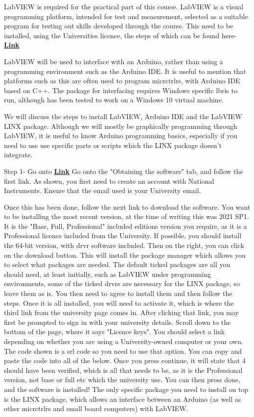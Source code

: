 \documentclass[a4paper,11pt]{report}
\let\oldhref\href %
\renewcommand{\href}[2]{\oldhref{#1}{\bfseries#2}}
\begin{document}
LabVIEW is required for the practical part of this course. LabVIEW is a visual programming platform, intended for test and measurement, selected as a suitable program for testing out skills developed through the course. This need to be installed, using the Universities licence, the steps of which can be found here- \href{https://www.york.ac.uk/it-services/software/a-z/labview/}{Link}

LabVIEW will be used to interface with an Arduino, rather than using a programming environment such as the Arduino IDE. It is useful to mention that platforms such as this are often used to program \gls{micrctrlr}s, with Arduino IDE based on C++. The package for interfacing requires Windows specific \gls{lbris} to run, although has been tested to work on a Windows 10 virtual machine.

We will discuss the steps to install LabVIEW, Arduino IDE and the LabVIEW LINX package. Although we will mostly be graphically programming through LabVIEW, it is useful to know Arduino programming basics, especially if you need to use use specific parts or scripts which the LINX package doesn't integrate.

Step 1- Go onto \href{https://www.york.ac.uk/it-services/software/a-z/labview/}{Link}
Go onto the "Obtaining the software" tab, and follow the first link. As shown, you first need to create an account with National Instruments. Ensure that the email used is your University email.

Once this has been done, follow the next link to download the software. You want to be installing the most recent version, at the time of writing this was 2021 SP1. It is the "Base, Full, Professional" included editions version you require, as it is a Professional licence included from the University. If possible, you should install the 64-bit version, with \gls{drvr} software included. Then on the right, you can click on the download button. This will install the package manager which allows you to select what packages are needed. The default ticked packages are all you should need, at least initially, such as LabVIEW under programming environments, some of the ticked \gls{drvr}s are necessary for the LINX package, so leave them as is. You then need to agree to install them and then follow the steps. Once it is all installed, you will need to activate it, which is where the third link from the university page comes in. After clicking that link, you may first be prompted to sign in with your university details. Scroll down to the bottom of the page, where it says "Licence keys". You should select a link depending on whether you are using a University-owned computer or your own. The code shown is a \gls{srl} code so you need to use that option. You can copy and paste the code into all of the below. Once you press continue, it will state that 4 should have been verified, which is all that needs to be, as it is the Professional version, not base or full etc which the university use. You can then press done, and the software is installed! The only specific package you need to install on top is the LINX package, which allows an interface between an Arduino (as well as other \gls{micrctrlr}s and small board computers) with LabVIEW.
\end{document}

